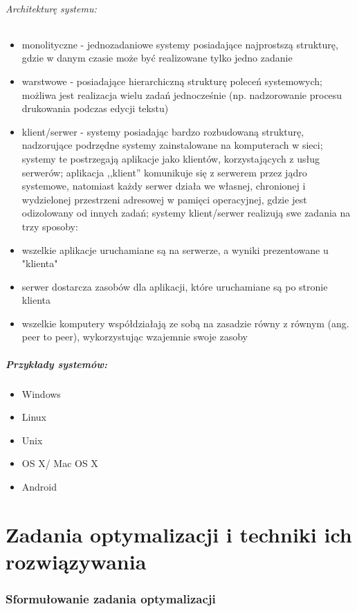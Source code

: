 \documentclass[a4paper,twoside]{report}
\begin{document}
\subparagraph{Architekturę systemu:}
\begin{itemize}

\item monolityczne - jednozadaniowe systemy posiadające najprostszą strukturę, gdzie w danym czasie może być realizowane tylko jedno zadanie
\item warstwowe - posiadające hierarchiczną strukturę poleceń systemowych; możliwa jest realizacja wielu zadań jednocześnie (np. nadzorowanie procesu drukowania podczas edycji tekstu)
\item klient/serwer - systemy posiadając bardzo rozbudowaną strukturę, nadzorujące podrzędne systemy zainstalowane na komputerach w sieci; systemy te postrzegają aplikacje jako klientów, korzystających z usług serwerów; aplikacja ,,klient'' komunikuje się z serwerem przez jądro systemowe, natomiast każdy serwer działa we własnej, chronionej i wydzielonej przestrzeni adresowej w pamięci operacyjnej, gdzie jest odizolowany od innych zadań; systemy klient/serwer realizują swe zadania na trzy sposoby:
\item wszelkie aplikacje uruchamiane są na serwerze, a wyniki prezentowane u "klienta"
\item serwer dostarcza zasobów dla aplikacji, które uruchamiane są po stronie klienta
\item wszelkie komputery współdziałają ze sobą na zasadzie równy z równym (ang. peer to peer), wykorzystując wzajemnie swoje zasoby
\end{itemize}

\paragraph{Przykłady systemów:}
\begin{itemize}
\item Windows
\item Linux
\item Unix
\item OS X/ Mac OS X
\item Android
\end{itemize}

\chapter{Zadania optymalizacji i techniki ich rozwiązywania}

\subsection{Sformułowanie zadania optymalizacji}
\end{document}
